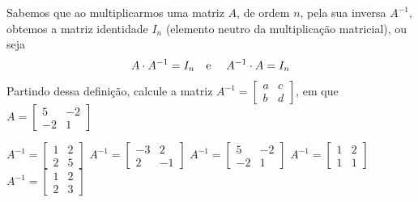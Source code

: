 Sabemos que ao multiplicarmos uma matriz $A$, de ordem $n$, pela sua inversa $A^{-1}$, obtemos a matriz identidade $I_n$ (elemento neutro da multiplicação matricial), ou seja
\[A\cdot A^{-1}=I_n\textnormal{\quad e \quad}A^{-1}\cdot A=I_n \]
Partindo dessa definição, calcule a matriz $A^{-1}=\left[ \begin{array}{cc}
a   &  c \\
b   &  d
\end{array} \right]$, em que $A = \left[ \begin{array}{cc}
5  & -2\\
-2  &  1
\end{array} \right]$

$A^{-1} = \left[ \begin{array}{cc} 1   &  2\\ 2  &   5 \end{array} \right]$
$A^{-1} = \left[ \begin{array}{cc} -3  &  2\\ 2  & -1 \end{array} \right]$
$A^{-1} = \left[ \begin{array}{cc} 5  & -2\\ -2  &  1 \end{array} \right]$
$A^{-1} = \left[ \begin{array}{cc} 1   &  2\\ 1  &   1 \end{array} \right]$
$A^{-1} = \left[ \begin{array}{cc} 1  &  2\\ 2  &  3 \end{array} \right]$


